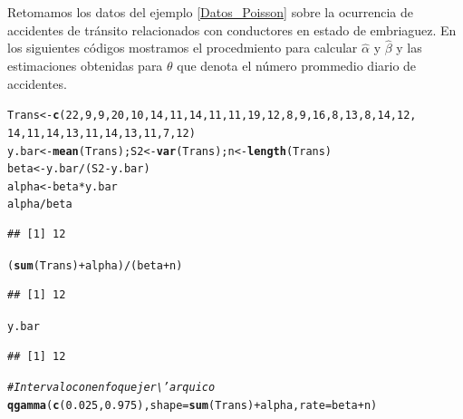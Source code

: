 \documentclass[10pt,openright]{book}\usepackage[]{graphicx}\usepackage[]{color}
\makeatletter
\newcommand{\hlnum}[1]{\textcolor[rgb]{0.686,0.059,0.569}{#1}}%
\newcommand{\hlcom}[1]{\textcolor[rgb]{0.678,0.584,0.686}{\textit{#1}}}%
\newcommand{\hlopt}[1]{\textcolor[rgb]{0,0,0}{#1}}%
\newcommand{\hlstd}[1]{\textcolor[rgb]{0.345,0.345,0.345}{#1}}%
\newcommand{\hlkwb}[1]{\textcolor[rgb]{0.69,0.353,0.396}{#1}}%
\newcommand{\hlkwc}[1]{\textcolor[rgb]{0.333,0.667,0.333}{#1}}%
\newcommand{\hlkwd}[1]{\textcolor[rgb]{0.737,0.353,0.396}{\textbf{#1}}}%
\newenvironment{kframe}{%
 \def\at@end@of@kframe{}%
 \ifinner\ifhmode%
  \def\at@end@of@kframe{\end{minipage}}%
  \begin{minipage}{\columnwidth}%
 \fi\fi%
 \def\FrameCommand##1{\hskip\@totalleftmargin \hskip-\fboxsep
 \colorbox{shadecolor}{##1}\hskip-\fboxsep
     \hskip-\linewidth \hskip-\@totalleftmargin \hskip\columnwidth}%
 \MakeFramed {\advance\hsize-\width
   \@totalleftmargin\z@ \linewidth\hsize
   \@setminipage}}%
 {\par\unskip\endMakeFramed%
 \at@end@of@kframe}
\newenvironment{knitrout}{}{} %
\makeatother
\begin{document}
\begin{Eje}
Retomamos los datos del ejemplo \ref{Datos_Poisson} sobre la ocurrencia de accidentes de tr\'ansito relacionados con conductores en estado de embriaguez. En los siguientes c\'odigos mostramos el procedmiento para calcular $\hat{\alpha}$ y $\hat{\beta}$ y las estimaciones obtenidas para $\theta$ que denota el n\'umero prommedio diario de accidentes. 
\begin{knitrout}
\color{fgcolor}\begin{kframe}
\begin{alltt}
\hlstd{Trans} \hlkwb{<-} \hlkwd{c}\hlstd{(}\hlnum{22}\hlstd{,} \hlnum{9}\hlstd{,} \hlnum{9}\hlstd{,} \hlnum{20}\hlstd{,} \hlnum{10}\hlstd{,} \hlnum{14}\hlstd{,} \hlnum{11}\hlstd{,} \hlnum{14}\hlstd{,} \hlnum{11}\hlstd{,} \hlnum{11}\hlstd{,} \hlnum{19}\hlstd{,} \hlnum{12}\hlstd{,} \hlnum{8}\hlstd{,} \hlnum{9}\hlstd{,} \hlnum{16}\hlstd{,} \hlnum{8}\hlstd{,} \hlnum{13}\hlstd{,} \hlnum{8}\hlstd{,} \hlnum{14}\hlstd{,} \hlnum{12}\hlstd{,}
           \hlnum{14}\hlstd{,} \hlnum{11}\hlstd{,} \hlnum{14}\hlstd{,} \hlnum{13}\hlstd{,} \hlnum{11}\hlstd{,} \hlnum{14}\hlstd{,} \hlnum{13}\hlstd{,} \hlnum{11}\hlstd{,} \hlnum{7}\hlstd{,} \hlnum{12} \hlstd{)}
\hlstd{y.bar} \hlkwb{<-} \hlkwd{mean}\hlstd{(Trans); S2} \hlkwb{<-} \hlkwd{var}\hlstd{(Trans); n} \hlkwb{<-} \hlkwd{length}\hlstd{(Trans)}
\hlstd{beta} \hlkwb{<-} \hlstd{y.bar}\hlopt{/}\hlstd{(S2}\hlopt{-}\hlstd{y.bar)}
\hlstd{alpha} \hlkwb{<-} \hlstd{beta}\hlopt{*}\hlstd{y.bar}
\hlstd{alpha}\hlopt{/}\hlstd{beta}
\end{alltt}
\begin{verbatim}
## [1] 12
\end{verbatim}
\begin{alltt}
\hlstd{(}\hlkwd{sum}\hlstd{(Trans)}\hlopt{+}\hlstd{alpha)}\hlopt{/}\hlstd{(beta}\hlopt{+}\hlstd{n)}
\end{alltt}
\begin{verbatim}
## [1] 12
\end{verbatim}
\begin{alltt}
\hlstd{y.bar}
\end{alltt}
\begin{verbatim}
## [1] 12
\end{verbatim}
\begin{alltt}
\hlcom{# Intervalo con enfoque jer\textbackslash{}'arquico}
\hlkwd{qgamma}\hlstd{(}\hlkwd{c}\hlstd{(}\hlnum{0.025}\hlstd{,}\hlnum{0.975}\hlstd{),} \hlkwc{shape}\hlstd{=}\hlkwd{sum}\hlstd{(Trans)}\hlopt{+}\hlstd{alpha,} \hlkwc{rate}\hlstd{=beta}\hlopt{+}\hlstd{n)}

\end{alltt}
\end{kframe}
\end{knitrout}
\end{Eje}
\end{document}
